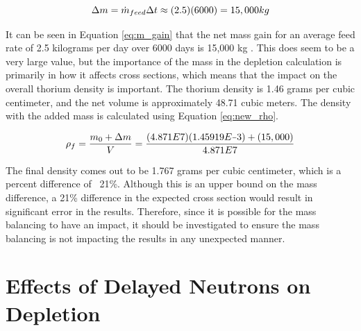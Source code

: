 \begin{equation} \hfill
\Delta m = \Dot{m}_{feed} \Delta t \approx (2.5)(6000) = 15,000 kg
\hfill\label{eq:m_gain} \end{equation}

It can be seen in Equation \eqref{eq:m_gain} that the net mass gain for an average feed rate of 2.5 kilograms per day over 6000 days is 15,000 kg \cite{rykhlevskii_fuel_2020, betzler_molten_2017}. This does seem to be a very large value, but the importance of the mass in the depletion calculation is primarily in how it affects cross sections, which means that the impact on the overall thorium density is important. The thorium density is 1.46 grams per cubic centimeter, and the net volume is approximately 48.71 cubic meters. The density with the added mass is calculated using Equation \eqref{eq:new_rho}.

\begin{equation} \hfill
\rho_f = \frac{m_0 + \Delta m}{V} = \frac{(4.871E7)(1.45919E\minus3) + (15,000)}{4.871E7} 
\hfill\label{eq:new_rho} \end{equation}

The final density comes out to be 1.767 grams per cubic centimeter, which is a percent difference of ~21\%. Although this is an upper bound on the mass difference, a 21\% difference in the expected cross section would result in significant error in the results. Therefore, since it is possible for the mass balancing to have an impact, it should be investigated to ensure the mass balancing is not impacting the results in any unexpected manner.









\section{Effects of Delayed Neutrons on Depletion}

